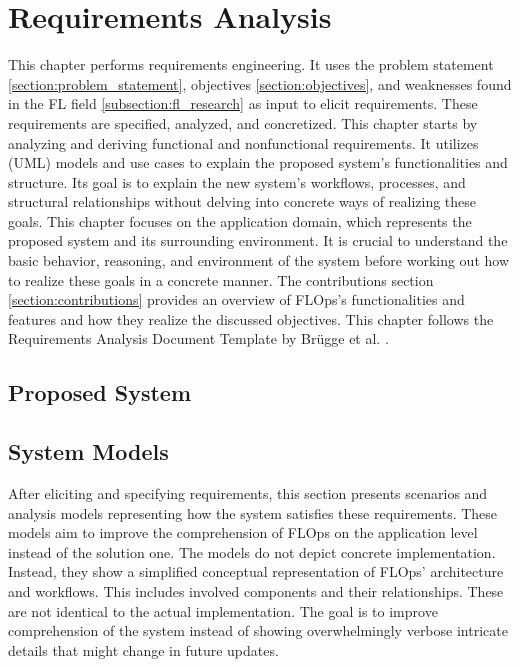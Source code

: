 \chapter{Requirements Analysis}

This chapter performs requirements engineering.
It uses the problem statement \ref{section:problem_statement}, objectives \ref{section:objectives}, and weaknesses found in the FL field \ref{subsection:fl_research} as input to elicit requirements.
These requirements are specified, analyzed, and concretized. 
This chapter starts by analyzing and deriving functional and nonfunctional requirements.
It utilizes (UML) models and use cases to explain the proposed system's functionalities and structure.
Its goal is to explain the new system's workflows, processes, and structural relationships without delving into concrete ways of realizing these goals.
This chapter focuses on the application domain, which represents the proposed system and its surrounding environment.
It is crucial to understand the basic behavior, reasoning, and environment of the system before working out how to realize these goals in a concrete manner.
The contributions section \ref{section:contributions} provides an overview of FLOps's functionalities and features and how they realize the discussed objectives.
This chapter follows the Requirements Analysis Document Template by Brügge et al. \cite{book:bruegge}.

\section{Proposed System}





\section{System Models}

After eliciting and specifying requirements, this section presents scenarios and analysis models representing how the system satisfies these requirements.
These models aim to improve the comprehension of FLOps on the application level instead of the solution one.
The models do not depict concrete implementation.
Instead, they show a simplified conceptual representation of FLOps' architecture and workflows.
This includes involved components and their relationships.
These are not identical to the actual implementation.
The goal is to improve comprehension of the system instead of showing overwhelmingly verbose intricate details that might change in future updates.

